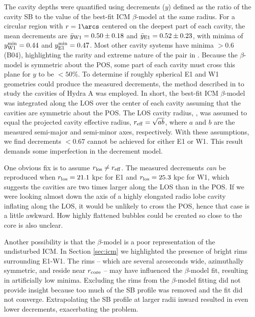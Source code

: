 \documentclass{emulateapj}
\begin{document}
The cavity depths were quantified using decrements ($y$) defined as
the ratio of the cavity SB to the value of the best-fit ICM
$\beta$-model at the same radius. For a circular region with $r =
1\arcs$ centered on the deepest part of each cavity, the mean
decrements are $\bar{y}_{\rm{W1}} = 0.50 \pm 0.18$ and
$\bar{y}_{\rm{E1}} = 0.52 \pm 0.23$, with minima of
$y^{\rm{min}}_{\rm{W1}} = 0.44$ and $y^{\rm{min}}_{\rm{E1}} =
0.47$. Most other cavity systems have minima $> 0.6$ (B04),
highlighting the rarity and extreme nature of the pair in
\rxj. Because the $\beta$-model is symmetric about the POS, some part
of each cavity must cross this plane for $y$ to be $< 50\%$. To
determine if roughly spherical E1 and W1 geometries could produce the
measured decrements, the method described in \citet{hydraa} to study
the cavities of Hydra A was employed. In short, the best-fit ICM
$\beta$-model was integrated along the LOS over the center of each
cavity assuming that the cavities are symmetric about the POS. The LOS
cavity radius, \rlos, was assumed to equal the projected cavity
effective radius, $r_{\rm{eff}} = \sqrt{ab}$, where $a$ and $b$ are the
measured semi-major and semi-minor axes, respectively. With these
assumptions, we find decrements $< 0.67$ cannot be achieved for either
E1 or W1. This result demands some imperfection in the decrement
model.

One obvious fix is to assume $r_{\rm{los}} \ne r_{\rm{eff}}$. The measured
decrements {\it{can}} be reproduced when $r_{\rm{los}} = 21.1$ kpc for E1 and
$r_{\rm{los}} = 25.3$ kpc for W1, which suggests the cavities are two times
larger along the LOS than in the POS. If we were looking almost down
the axis of a highly elongated radio lobe cavity inflating along the
LOS, it would be unlikely to cross the POS, hence that case is a
little awkward. How highly flattened bubbles could be created so close
to the core is also unclear.

Another possibility is that the $\beta$-model is a poor representation
of the undisturbed ICM. In Section \ref{sec:icm} we highlighted the
presence of bright rims surrounding E1-W1. The rims -- which are
several arcseconds wide, azimuthally symmetric, and reside near
$r_{\rm{core}}$ -- may have influenced the $\beta$-model fit,
resulting in artificially low minima. Excluding the rims from the
$\beta$-model fitting did not provide insight because too much of the
SB profile was removed and the fit did not converge. Extrapolating the
SB profile at larger radii inward resulted in even lower decrements,
exacerbating the problem.
\end{document}
